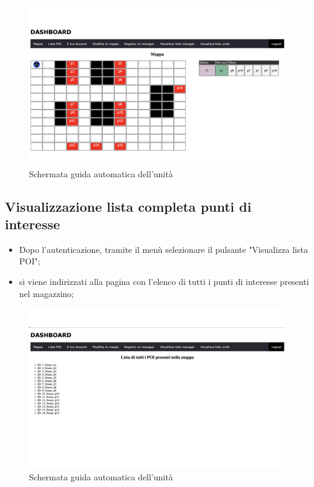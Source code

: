 \begin{figure}[H]
    \centering
    \includegraphics[scale=0.12]{res/images/map_user.png}
    \caption{Schermata guida automatica dell'unità}
\end{figure}

\subsection{Visualizzazione lista completa punti di interesse}
\begin{itemize}
    \item Dopo l'autenticazione, tramite il menù selezionare il pulsante "Visualizza lista POI";
    \item si viene indirizzati alla pagina con l'elenco di tutti i punti di interesse presenti nel magazzino;
    
\end{itemize}

\begin{figure}[H]
    \centering
    \includegraphics[scale=0.12]{res/images/listpoi_user.png}
    \caption{Schermata guida automatica dell'unità}
\end{figure}


